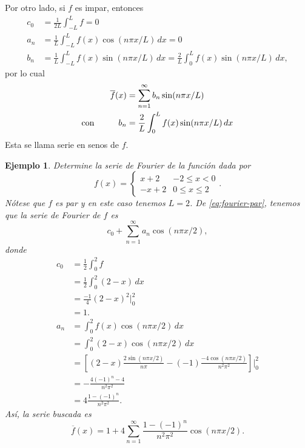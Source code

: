 \documentclass[11pt,letterpaper]{report}
\newtheorem{example}[defn]{Ejemplo}
\newcommand\<{\langle}
\renewcommand\>{\rangle}
\begin{document}
Por otro lado, si $f$ es impar, entonces
\begin{align*}
  c_0 &= \frac{1}{2L}\int_{-L}^L f = 0 \\
  a_n
    &= \frac{1}{L}\int_{-L}^L f(x)\cos(n\pi x/L)\,dx
    = 0 \\
  b_n
    &= \frac{1}{L}\int_{-L}^L f(x)\sin(n\pi x/L)\,dx
    = \frac{2}{L}\int_{0}^L f(x)\sin(n\pi x/L)\,dx,
\end{align*}
por lo cual
\begin{equation}\label{eq:fourier-impar}
\begin{aligned}
  \overline{f}(x)
  &=
  \sum_{n=1}^{\infty}b_n\sin(n\pi x/L) \\
  \text{con}\hspace{10mm}
  b_n
  &= \frac{2}{L}\int_{0}^L f(x)\sin(n\pi x/L)\,dx
\end{aligned}
\end{equation}
Esta se llama serie en senos de $f$.

\begin{example}
  Determine la serie de Fourier de la función dada por
  \[
    f(x) =
    \begin{cases}
      x+2 & -2\leq x<0 \\
      -x+2 & 0\leq x\leq 2
    \end{cases}
  .\]
  Nótese que $f$ es par y en este caso tenemos $L=2$.
  De \eqref{eq:fourier-par}, tenemos que la serie de Fourier de $f$ es
  \[
    c_0+\sum_{n=1}^{\infty}a_n\cos(n\pi x /2)
  ,\]
  donde
  \begin{align*}
    c_0
    &= \frac{1}{2}\int_{0}^{2}f \\
    &= \frac{1}{2}\int_{0}^{2}(2-x)\,dx \\
    &= \frac{-1}{4}(2-x)^{2}\Big|_{0}^{2} \\
    &= 1. \\
    a_n
    &= \int_{0}^{2}f(x)\cos(n\pi x /2)\,dx \\
    &= \int_{0}^{2}(2-x)\cos(n\pi x /2)\,dx \\
    &=
    \left[
      (2-x)\frac{2\sin(n\pi x /2)}{n\pi}
      -(-1) \frac{-4\cos(n\pi x /2)}{n^{2}\pi^{2}}
    \right]\Big|_{0}^{2}
    \\
    &=
      -\frac{4(-1)^{n}-4}{n^{2}\pi^{2}}
    \\
    &= 4\frac{1-(-1)^{n}}{n^{2}\pi^{2}}.
  \end{align*}
  Así, la serie buscada es
  \[
    \overline{f}(x)
    =
    1 + 4 \sum_{n=1}^{\infty}
    \frac{1-(-1)^{n}}{n^{2}\pi^{2}}\cos(n\pi x / 2)
  .\]
\end{example}
\end{document}
